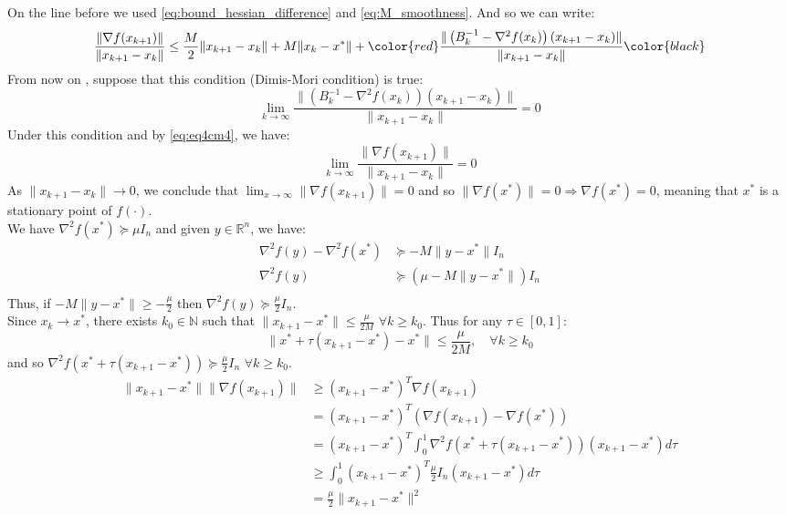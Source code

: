 \documentclass[12pt, openany]{report}
\newcommand{\R}{\mathbb{R}}
\newcommand{\N}{\mathbb{N}}
\theoremstyle{definition}
\begin{document}
On the line before we used \eqref{eq:bound_hessian_difference} and \eqref{eq:M_smoothness}. And so we can write:
\begin{equation}\label{eq:eq4cm4}
	\frac{\|\nabla f(x_{k+1})\|}{\|x_{k+1}-x_k\|} \leq \frac{M}{2} \|x_{k+1}-x_k\| + M \|x_k - x^* \| + \color{red} \frac{\|\left(B_k^{-1}-\nabla^2f(x_k)\right)(x_{k+1}-x_k)\|}{\|x_{k+1}-x_k\|}\color{black}
\end{equation}
From now on , suppose that this condition (Dimis-Mori condition) is true:
\begin{equation}\label{eq:dimis_mori_condition}
	\lim_{k\to \infty} \frac{\|\left(B_k^{-1}-\nabla^2f(x_k)\right)(x_{k+1}-x_k)\|}{\|x_{k+1}-x_k\|} = 0
\end{equation}
Under this condition and by \eqref{eq:eq4cm4}, we have:
\begin{equation}
	\lim_{k \to \infty} \frac{\|\nabla f(x_{k+1})\|}{\|x_{k+1}-x_k\|} = 0
\end{equation}
As $\|x_{k+1}-x_k\| \to 0$, we conclude that $\lim_{x \to \infty} \|\nabla f(x_{k+1})\| = 0$ and so $\|\nabla f(x^*)\| = 0 \Rightarrow \nabla f(x^*) = 0$, meaning that $x^*$ is a stationary point of $f(\cdot)$.\\
We have $\nabla^2 f(x^*) \succeq \mu I_n$ and given $y \in \R^n$, we have:
\begin{equation}
	\begin{aligned}
		\nabla^2f(y)-\nabla^2f(x^*) &\succeq - M \|y-x^*\| I_n\\
		\nabla^2f(y) &\succeq (\mu - M \|y-x^*\|) I_n\\
	\end{aligned}
\end{equation}
Thus, if $-M \|y-x^*\| \geq - \frac{\mu}{2}$ then $\nabla^2f(y) \succeq \frac{\mu}{2} I_n$.\\
Since $x_k \to x^*$, there exists $k_0 \in \N$ such that $\|x_{k+1}-x^*\| \leq \frac{\mu}{2M}$ $\forall k \geq k_0$. Thus for any $\tau \in [0,1]$:
\begin{equation}
	\|x^*+\tau(x_{k+1}-x^*)-x^*\| \leq \frac{\mu}{2M}, \quad \forall k \geq k_0
\end{equation}
and so $\nabla^2f(x^*+\tau(x_{k+1}-x^*)) \succeq \frac{\mu}{2} I_n$ $\forall k \geq k_0$.
\begin{equation}
	\begin{aligned}
		\|x_{k+1}-x^*\|\|\nabla f(x_{k+1})\| &\geq (x_{k+1}-x^*)^T\nabla f(x_{k+1})\\
		&= (x_{k+1}-x^*)^T \left( \nabla f(x_{k+1}) - \nabla f(x^*)\right)\\
		&= (x_{k+1}-x^*)^T \int_{0}^{1} \nabla^2 f(x^*+\tau(x_{k+1}-x^*)) (x_{k+1}-x^*) d\tau\\
		&\geq \int_{0}^{1} (x_{k+1}-x^*)^T \frac{\mu}{2} I_n (x_{k+1}-x^*) d\tau\\
		&= \frac{\mu}{2} \|x_{k+1}-x^*\|^2
	\end{aligned}
\end{equation}
\end{document}

